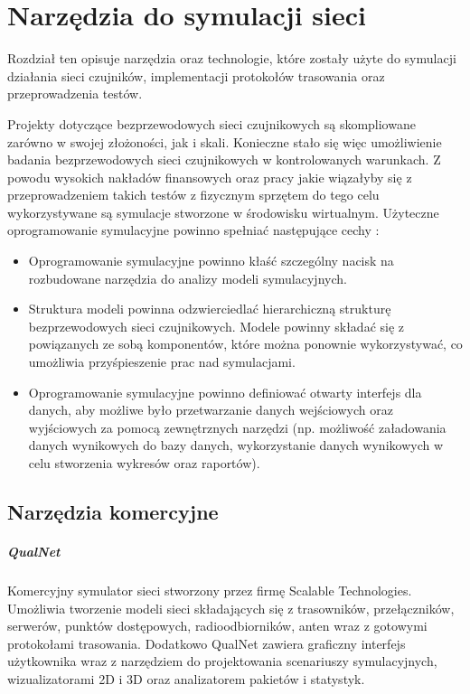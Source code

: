 \chapter{Narzędzia do symulacji sieci}
Rozdział ten opisuje narzędzia oraz technologie, które zostały użyte do symulacji działania sieci czujników, implementacji protokołów trasowania oraz przeprowadzenia testów.

Projekty dotyczące  bezprzewodowych sieci czujnikowych są skompliowane zarówno w swojej złożoności, jak i skali. Konieczne stało się więc umożliwienie badania bezprzewodowych sieci czujnikowych w kontrolowanych warunkach. Z powodu wysokich nakładów finansowych oraz pracy jakie wiązałyby się z przeprowadzeniem takich testów z fizycznym sprzętem do tego celu wykorzystywane są symulacje stworzone w środowisku wirtualnym. Użyteczne oprogramowanie symulacyjne powinno spełniać  następujące cechy \cite{Xian2008}:
\begin{itemize}
	\item Oprogramowanie symulacyjne powinno kłaść szczególny nacisk na rozbudowane narzędzia do analizy modeli symulacyjnych.
	
	\item Struktura modeli powinna odzwierciedlać hierarchiczną strukturę bezprzewodowych sieci czujnikowych. Modele powinny składać się z powiązanych ze sobą komponentów, które można ponownie wykorzystywać, co umożliwia przyśpieszenie prac nad symulacjami.
	
	\item Oprogramowanie symulacyjne powinno definiować otwarty interfejs dla danych, aby możliwe było przetwarzanie danych wejściowych oraz wyjściowych za pomocą zewnętrznych narzędzi (np. możliwość załadowania danych wynikowych do bazy danych, wykorzystanie danych wynikowych w celu stworzenia wykresów oraz raportów).
\end{itemize}
\section{Narzędzia komercyjne}
\paragraph{QualNet \cite{Kellner10simulationenvironments}}
Komercyjny symulator sieci stworzony przez firmę Scalable Technologies. Umożliwia tworzenie modeli sieci składających się z trasowników, przełączników, serwerów, punktów dostępowych, radioodbiorników, anten wraz z gotowymi protokołami trasowania. Dodatkowo QualNet zawiera graficzny interfejs użytkownika wraz z narzędziem do projektowania scenariuszy symulacyjnych, wizualizatorami 2D i 3D oraz analizatorem pakietów i statystyk.


